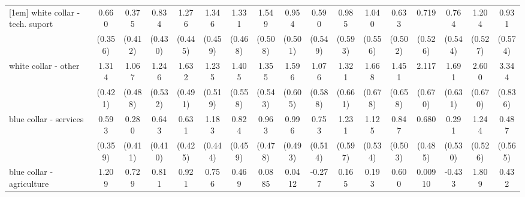{\begin{tabular}{l*{16}{c}}
[1em]
white collar - tech. suport&       0.660         &       0.375         &       0.834         &       1.276\sym{**} &       1.346\sym{**} &       1.331\sym{**} &       1.549\sym{**} &       0.954         &       0.590         &       0.985         &       1.040         &       0.633         &       0.719         &       0.764         &       1.204\sym{*}  &       0.931         \\
                    &     (0.356)         &     (0.412)         &     (0.430)         &     (0.445)         &     (0.459)         &     (0.468)         &     (0.508)         &     (0.501)         &     (0.549)         &     (0.593)         &     (0.556)         &     (0.502)         &     (0.526)         &     (0.544)         &     (0.527)         &     (0.574)         \\
[1em]
white collar - other&       1.314\sym{**} &       1.067\sym{*}  &       1.246\sym{*}  &       1.632\sym{***}&       1.235\sym{*}  &       1.405\sym{*}  &       1.355\sym{*}  &       1.596\sym{**} &       1.076         &       1.321\sym{*}  &       1.668\sym{*}  &       1.451\sym{*}  &       2.117\sym{**} &       1.691\sym{**} &       2.600\sym{***}&       3.344\sym{***}\\
                    &     (0.421)         &     (0.488)         &     (0.532)         &     (0.491)         &     (0.519)         &     (0.558)         &     (0.543)         &     (0.605)         &     (0.588)         &     (0.661)         &     (0.678)         &     (0.658)         &     (0.670)         &     (0.631)         &     (0.670)         &     (0.836)         \\
[1em]
blue collar - services&       0.593         &       0.280         &       0.643         &       0.631         &       1.183\sym{**} &       0.824         &       0.963\sym{*}  &       0.996\sym{*}  &       0.753         &       1.231\sym{*}  &       1.125\sym{*}  &       0.847         &       0.680         &       0.291         &       1.244\sym{*}  &       0.487         \\
                    &     (0.359)         &     (0.411)         &     (0.410)         &     (0.425)         &     (0.444)         &     (0.459)         &     (0.478)         &     (0.493)         &     (0.514)         &     (0.597)         &     (0.534)         &     (0.503)         &     (0.485)         &     (0.530)         &     (0.526)         &     (0.565)         \\
[1em]
blue collar - agriculture&       1.209\sym{*}  &       0.729         &       0.811         &       0.921         &       0.756         &       0.469         &      0.0885         &      0.0412         &      -0.277         &       0.165         &       0.193         &       0.600         &     0.00910         &      -0.433         &       1.809\sym{*}  &       0.432         \\

\end{tabular}}
